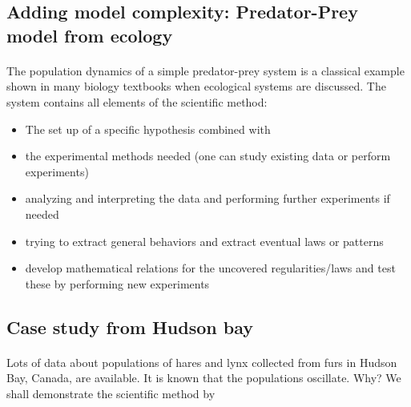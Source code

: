 \documentclass[%
twoside,                 %
final,                   %
10pt]{article}
\begin{document}
\noindent



\subsection{Adding model complexity: Predator-Prey model from ecology}


\paragraph{}
The population dynamics of a simple predator-prey system is a
classical example shown in many biology textbooks when ecological
systems are discussed. The system contains all elements of the
scientific method:

\begin{itemize}
 \item The set up of a specific hypothesis combined with

 \item the experimental methods needed (one can study existing data or perform experiments)

 \item analyzing and interpreting the data and performing further experiments if needed

 \item trying to extract general behaviors and extract eventual laws or patterns

 \item develop mathematical relations for the uncovered regularities/laws and test these by performing new experiments
\end{itemize}

\noindent




\subsection{Case study from Hudson bay}


\paragraph{}
Lots of data about populations of hares and lynx collected from furs in Hudson Bay, Canada, are available. It is known that the populations oscillate. Why?
We shall demonstrate the scientific method by
\end{document}
